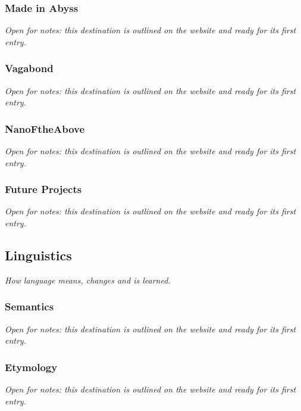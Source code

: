 \documentclass{article}
\begin{document}
\subsubsection{Made in Abyss}\label{sec:made-in-abyss}
\textit{Open for notes: this destination is outlined on the website and ready for its first entry.}

\subsubsection{Vagabond}\label{sec:vagabond}
\textit{Open for notes: this destination is outlined on the website and ready for its first entry.}

\subsubsection{NanoFtheAbove}\label{sec:nanoftheabove}
\textit{Open for notes: this destination is outlined on the website and ready for its first entry.}

\subsubsection{Future Projects}\label{sec:future-projects}
\textit{Open for notes: this destination is outlined on the website and ready for its first entry.}

\subsection{Linguistics}\label{sec:linguistics}
\textit{How language means, changes and is learned.}

\subsubsection{Semantics}\label{sec:semantics}
\textit{Open for notes: this destination is outlined on the website and ready for its first entry.}

\subsubsection{Etymology}\label{sec:etymology}
\textit{Open for notes: this destination is outlined on the website and ready for its first entry.}
\end{document}
